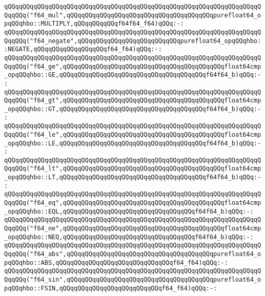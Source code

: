 \verb|qQQqqQQqqQQqqQQqqQQqqQQqqQQqqQQqqQQqqQQqqQQqqQQqqQQqqQQqqQQqqQQqqQQqqQQqqQQq("f64_mul",qQQqqQQqqQQqqQQqqQQqqQQqqQQqqQQqqQQqqQQqpurefloat64_opqQQqhbo::MULTIPLY,qQQqqQQqqQQqf64f64_f64)qQQq:-:|\newline
\verb|qQQqqQQqqQQqqQQqqQQqqQQqqQQqqQQqqQQqqQQqqQQqqQQqqQQqqQQqqQQqqQQqqQQqqQQqqQQq("f64_negate",qQQqqQQqqQQqqQQqqQQqqQQqqQQqpurefloat64_opqQQqhbo::NEGATE,qQQqqQQqqQQqqQQqqQQqf64_f64)qQQq:-:|\newline
\verb|qQQqqQQqqQQqqQQqqQQqqQQqqQQqqQQqqQQqqQQqqQQqqQQqqQQqqQQqqQQqqQQqqQQqqQQqqQQq("f64_ge",qQQqqQQqqQQqqQQqqQQqqQQqqQQqqQQqqQQqqQQqqQQqfloat64cmp_opqQQqhbo::GE,qQQqqQQqqQQqqQQqqQQqqQQqqQQqqQQqqQQqqQQqf64f64_b)qQQq:-:|\newline
\verb|qQQqqQQqqQQqqQQqqQQqqQQqqQQqqQQqqQQqqQQqqQQqqQQqqQQqqQQqqQQqqQQqqQQqqQQqqQQq("f64_gt",qQQqqQQqqQQqqQQqqQQqqQQqqQQqqQQqqQQqqQQqqQQqfloat64cmp_opqQQqhbo::GT,qQQqqQQqqQQqqQQqqQQqqQQqqQQqqQQqqQQqqQQqf64f64_b)qQQq:-:|\newline
\verb|qQQqqQQqqQQqqQQqqQQqqQQqqQQqqQQqqQQqqQQqqQQqqQQqqQQqqQQqqQQqqQQqqQQqqQQqqQQq("f64_le",qQQqqQQqqQQqqQQqqQQqqQQqqQQqqQQqqQQqqQQqqQQqfloat64cmp_opqQQqhbo::LE,qQQqqQQqqQQqqQQqqQQqqQQqqQQqqQQqqQQqqQQqf64f64_b)qQQq:-:|\newline
\verb|qQQqqQQqqQQqqQQqqQQqqQQqqQQqqQQqqQQqqQQqqQQqqQQqqQQqqQQqqQQqqQQqqQQqqQQqqQQq("f64_lt",qQQqqQQqqQQqqQQqqQQqqQQqqQQqqQQqqQQqqQQqqQQqfloat64cmp_opqQQqhbo::LT,qQQqqQQqqQQqqQQqqQQqqQQqqQQqqQQqqQQqqQQqf64f64_b)qQQq:-:|\newline
\verb|qQQqqQQqqQQqqQQqqQQqqQQqqQQqqQQqqQQqqQQqqQQqqQQqqQQqqQQqqQQqqQQqqQQqqQQqqQQq("f64_eq",qQQqqQQqqQQqqQQqqQQqqQQqqQQqqQQqqQQqqQQqqQQqfloat64cmp_opqQQqhbo::EQL,qQQqqQQqqQQqqQQqqQQqqQQqqQQqqQQqqQQqf64f64_b)qQQq:-:|\newline
\verb|qQQqqQQqqQQqqQQqqQQqqQQqqQQqqQQqqQQqqQQqqQQqqQQqqQQqqQQqqQQqqQQqqQQqqQQqqQQq("f64_ne",qQQqqQQqqQQqqQQqqQQqqQQqqQQqqQQqqQQqqQQqqQQqfloat64cmp_opqQQqhbo::NEQ,qQQqqQQqqQQqqQQqqQQqqQQqqQQqqQQqqQQqf64f64_b)qQQq:-:|\newline
\verb|qQQqqQQqqQQqqQQqqQQqqQQqqQQqqQQqqQQqqQQqqQQqqQQqqQQqqQQqqQQqqQQqqQQqqQQqqQQq("f64_abs",qQQqqQQqqQQqqQQqqQQqqQQqqQQqqQQqqQQqqQQqpurefloat64_opqQQqhbo::ABS,qQQqqQQqqQQqqQQqqQQqqQQqqQQqqQQqf64_f64)qQQq:-:|\newline
\newline
\verb|qQQqqQQqqQQqqQQqqQQqqQQqqQQqqQQqqQQqqQQqqQQqqQQqqQQqqQQqqQQqqQQqqQQqqQQqqQQq("f64_sin",qQQqqQQqqQQqqQQqqQQqqQQqqQQqqQQqqQQqqQQqpurefloat64_opqQQqhbo::FSIN,qQQqqQQqqQQqqQQqqQQqqQQqqQQqf64_f64)qQQq:-:|\newline
